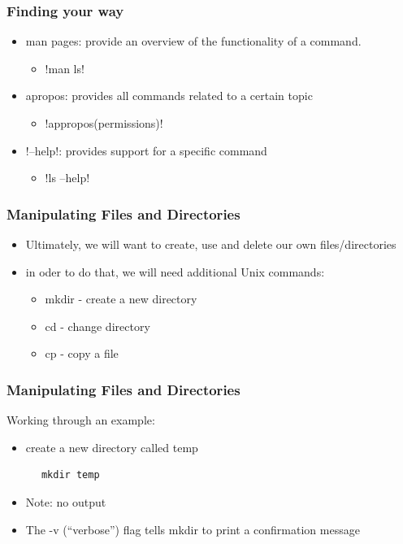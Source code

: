 \documentclass{beamer}
\begin{document}
\begin{frame}[fragile]\frametitle{Finding your way}
\begin{itemize}
\item man pages: provide an overview of the functionality of a command.
\begin{itemize}
\item !man ls!
\end{itemize}
\end{itemize}
\begin{itemize}
\item apropos: provides all commands related to a certain topic
\begin{itemize}
\item !appropos(permissions)!
\end{itemize}
\end{itemize}
\begin{itemize}
\item !--help!: provides support for a specific command
\begin{itemize}
\item !ls --help!
\end{itemize}
\end{itemize}
\end{frame}


\begin{frame}[fragile]\frametitle{Manipulating Files and Directories}
\begin{itemize}
\item Ultimately, we will want to create, use and delete our own files/directories
\item in oder to do that, we will need additional Unix commands:
\begin{itemize}
\item mkdir - create a new directory
\item cd - change directory
\item cp - copy a file
\end{itemize}
\end{itemize}
\end{frame}

\begin{frame}[fragile]\frametitle{Manipulating Files and Directories}
Working through an example:
\begin{itemize}
\item create a new directory called temp
\end{itemize}
\begin{block}{}
\begin{lstlisting}
      mkdir temp
\end{lstlisting}
\end{block}
\begin{itemize}
 \item Note: no output
 \item The -v (“verbose”) flag tells mkdir to print a confirmation message
\end{itemize}
\end{frame}
\end{document}

